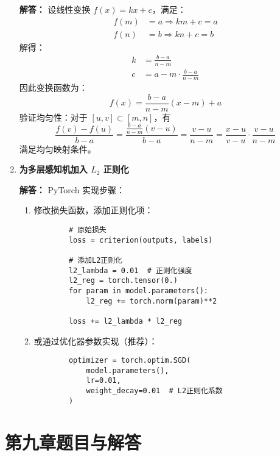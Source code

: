 \documentclass[a4paper,12pt]{book}
\begin{document}
\begin{enumerate}[label=\arabic*.]
    \textbf{解答：} 设线性变换 $f(x) = kx + c$，满足：
    \begin{align*}
    f(m) &= a \Rightarrow km + c = a \\
    f(n) &= b \Rightarrow kn + c = b
    \end{align*}
    解得：
    \begin{align*}
    k &= \frac{b - a}{n - m} \\
    c &= a - m \cdot \frac{b - a}{n - m}
    \end{align*}
    因此变换函数为：
    \[
    f(x) = \frac{b - a}{n - m} (x - m) + a
    \]
    验证均匀性：对于 $[u,v] \subset [m,n]$，有
    \[
    \frac{f(v) - f(u)}{b - a} = \frac{\frac{b-a}{n-m}(v - u)}{b - a} = \frac{v - u}{n - m} = \frac{x - u}{v - u} \cdot \frac{v - u}{n - m}
    \]
    满足均匀映射条件。
    
    \item \textbf{为多层感知机加入 $L_2$ 正则化}
    
    \textbf{解答：} PyTorch 实现步骤：
    \begin{enumerate}
        \item 修改损失函数，添加正则化项：
        \begin{verbatim}
        # 原始损失
        loss = criterion(outputs, labels)
        
        # 添加L2正则化
        l2_lambda = 0.01  # 正则化强度
        l2_reg = torch.tensor(0.)
        for param in model.parameters():
            l2_reg += torch.norm(param)**2
        
        loss += l2_lambda * l2_reg
        \end{verbatim}
        
        \item 或通过优化器参数实现（推荐）：
        \begin{verbatim}
        optimizer = torch.optim.SGD(
            model.parameters(), 
            lr=0.01, 
            weight_decay=0.01  # L2正则化系数
        )
        \end{verbatim}
        
    \end{enumerate}
\end{enumerate}
\section*{第九章题目与解答}
\end{document}
